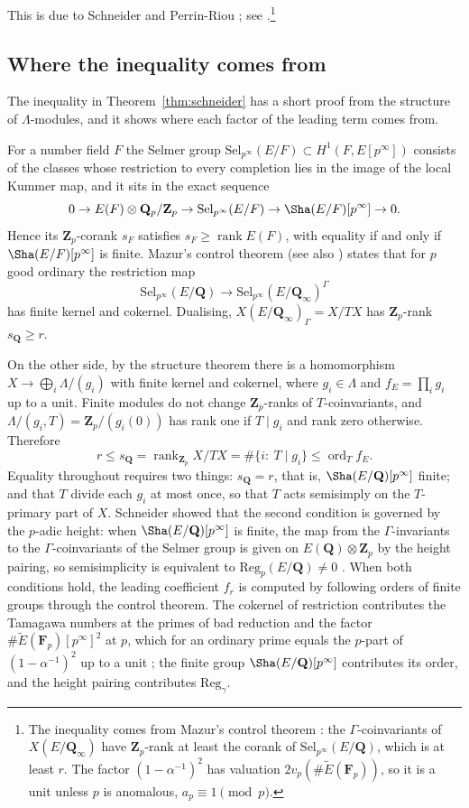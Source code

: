 \documentclass[11pt]{amsart}
\theoremstyle{definition}
\newcommand{\Q}{\mathbf{Q}}
\newcommand{\Z}{\mathbf{Z}}
\newcommand{\F}{\mathbf{F}}
\newcommand{\Zp}{\mathbf{Z}_p}
\newcommand{\Sel}{\mathrm{Sel}}
\newcommand{\Reg}{\mathrm{Reg}}
\newcommand{\rk}{\operatorname{rank}}
\newcommand{\ord}{\operatorname{ord}}
\begin{document}
This is due to Schneider \cite{Sch85} and Perrin-Riou \cite{PR93}; see \cite[Thm.~6.1]{SW13}.\footnote{The inequality comes from Mazur's control theorem \cite{Maz72}: the $\Gamma$-coinvariants of $X(E/\Q_\infty)$ have $\Zp$-rank at least the corank of $\Sel_{p^\infty}(E/\Q)$, which is at least $r$. The factor $(1-\alpha^{-1})^2$ has valuation $2v_p(\#\tilde E(\F_p))$, so it is a unit unless $p$ is anomalous, $a_p\equiv1\pmod p$.}

\subsection{Where the inequality comes from}
The inequality in Theorem~\ref{thm:schneider} has a short proof from the structure of $\Lambda$-modules, and it shows where each factor of the leading term comes from.

For a number field $F$ the Selmer group $\Sel_{p^\infty}(E/F)\subset H^1(F,E[p^\infty])$ consists of the classes whose restriction to every completion lies in the image of the local Kummer map, and it sits in the exact sequence
\[
0\to E(F)\otimes\Q_p/\Z_p\to\Sel_{p^\infty}(E/F)\to\Sha(E/F)[p^\infty]\to0 .
\]
Hence its $\Zp$-corank $s_F$ satisfies $s_F\ge\rk E(F)$, with equality if and only if $\Sha(E/F)[p^\infty]$ is finite. Mazur's control theorem \cite{Maz72} (see also \cite{Gre99}) states that for $p$ good ordinary the restriction map
\[
\Sel_{p^\infty}(E/\Q)\longrightarrow\Sel_{p^\infty}(E/\Q_\infty)^{\Gamma}
\]
has finite kernel and cokernel. Dualising, $X(E/\Q_\infty)_\Gamma=X/TX$ has $\Zp$-rank $s_\Q\ge r$.

On the other side, by the structure theorem there is a homomorphism $X\to\bigoplus_i\Lambda/(g_i)$ with finite kernel and cokernel, where $g_i\in\Lambda$ and $f_E=\prod_ig_i$ up to a unit. Finite modules do not change $\Zp$-ranks of $T$-coinvariants, and $\Lambda/(g_i,T)=\Zp/(g_i(0))$ has rank one if $T\mid g_i$ and rank zero otherwise. Therefore
\[
r\le s_\Q=\rk_{\Zp}X/TX=\#\{i:\ T\mid g_i\}\le\ord_Tf_E .
\]
Equality throughout requires two things: $s_\Q=r$, that is, $\Sha(E/\Q)[p^\infty]$ finite; and that $T$ divide each $g_i$ at most once, so that $T$ acts semisimply on the $T$-primary part of $X$. Schneider showed that the second condition is governed by the $p$-adic height: when $\Sha(E/\Q)[p^\infty]$ is finite, the map from the $\Gamma$-invariants to the $\Gamma$-coinvariants of the Selmer group is given on $E(\Q)\otimes\Zp$ by the height pairing, so semisimplicity is equivalent to $\Reg_p(E/\Q)\ne0$ \cite{Sch85}. When both conditions hold, the leading coefficient $f_r$ is computed by following orders of finite groups through the control theorem. The cokernel of restriction contributes the Tamagawa numbers at the primes of bad reduction and the factor $\#\tilde E(\F_p)[p^\infty]^2$ at $p$, which for an ordinary prime equals the $p$-part of $(1-\alpha^{-1})^2$ up to a unit \cite{Gre99}; the finite group $\Sha(E/\Q)[p^\infty]$ contributes its order, and the height pairing contributes $\Reg_\gamma$.
\end{document}
